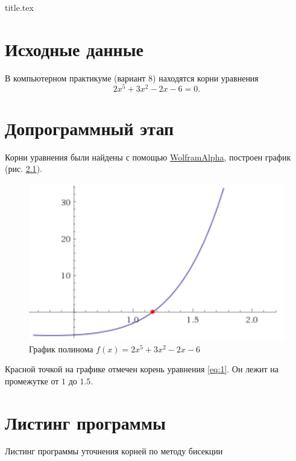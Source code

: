 




{title.tex}

\clearpage



\clearpage
{}
\pagestyle{fancy}
\setcounter{page}{2}

\clearpage

\chapter{Исходные данные}

В компьютерном практикуме (вариант 8) находятся корни уравнения
\begin{equation} \label{eq:1}
2x^5 + 3x^2 - 2x - 6 = 0.
\end{equation}

\chapter{Допрограммный этап}

Корни уравнения были найдены с помощью \href{http://www.wolframalpha.com}{WolframAlpha}, построен график (рис. \ref{fig:plot}).

\begin{figure}[h!]
  \centering
  \includegraphics[width=.3\textwidth]{plot.png}
  \caption{График полинома $f \left( x \right) = 2x^5 + 3x^2 - 2x - 6$}
\label{fig:plot}
\end{figure}

Красной точкой на графике отмечен корень уравнения \ref{eq:1}.
Он лежит на промежутке от $1$ до $1.5$.

\chapter{Листинг программы}
Листинг программы уточнения корней по методу бисекции
\lstset{inputencoding=utf8, extendedchars=\true}



